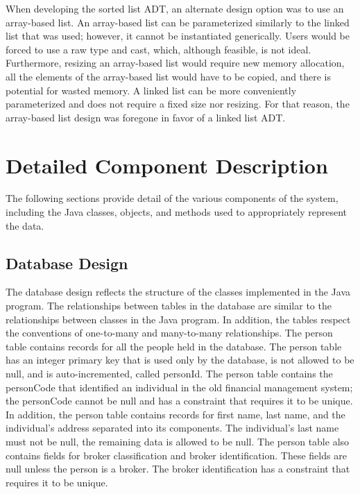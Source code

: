 \documentclass[12pt]{scrartcl} %
\begin{document}
    When developing the sorted list ADT, an alternate design option was to use an array-based list.  An array-based list can be parameterized similarly to the linked list that was used; however, it cannot be instantiated generically.  Users would be forced to use a raw type and cast, which, although feasible, is not ideal.  Furthermore, resizing an array-based list would require new memory allocation, all the elements of the array-based list would have to be copied, and there is potential for wasted memory.  A linked list can be more conveniently parameterized and does not require a fixed size nor resizing.  For that reason, the array-based list design was foregone in favor of a linked list ADT.

    \section{Detailed Component Description}

    The following sections provide detail of the various components of the system, including the Java classes, objects, and methods used to appropriately represent the data.

    \subsection{Database Design}

    The database design reflects the structure of the classes implemented in the Java program.  The relationships between tables in the database are similar to the relationships between classes in the Java program.  In addition, the tables respect the conventions of one-to-many and many-to-many relationships.  The person table contains records for all the people held in the database.  The person table has an integer primary key that is used only by the database, is not allowed to be null, and is auto-incremented, called personId.  The person table contains the personCode that identified an individual in the old financial management system; the personCode cannot be null and has a constraint that requires it to be unique.  In addition, the person table contains records for first name, last name, and the individual's address separated into its components.  The individual's last name must not be null, the remaining data is allowed to be null.  The person table also contains fields for broker classification and broker identification.  These fields are null unless the person is a broker.  The broker identification has a constraint that requires it to be unique.
\end{document}
